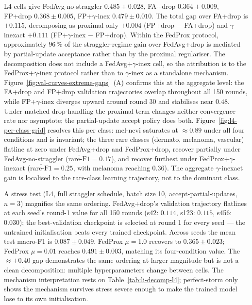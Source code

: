 \documentclass[11pt,a4paper]{report}
\begin{document}
L4 cells give FedAvg-no-straggler $0.485 \pm 0.028$, FA+drop
$0.364 \pm 0.009$, FP+drop $0.368 \pm 0.005$, FP+$\gamma$-inex
$0.479 \pm 0.010$. The total gap over FA+drop is $+0.115$, decomposing as
proximal-only $+0.004$ (FP+drop $-$ FA+drop) and $\gamma$-inexact $+0.111$
(FP+$\gamma$-inex $-$ FP+drop). Within the FedProx protocol, approximately
$96\,\%$ of the straggler-regime gain over FedAvg+drop is mediated by
partial-update acceptance rather than by the proximal regulariser. The
decomposition does not include a FedAvg+$\gamma$-inex cell, so the
attribution is to the FedProx+$\gamma$-inex protocol rather than to
$\gamma$-inex as a standalone mechanism.
Figure~\ref{fig:val-curves-extreme-gaps}~(A) confirms this at the aggregate
level: the FA+drop and FP+drop validation trajectories overlap throughout all
150 rounds, while FP+$\gamma$-inex diverges upward around round 30 and
stabilises near $0.48$. Under matched drop-handling the proximal term
changes neither convergence rate nor asymptote; the partial-update accept
policy does both. Figure~\ref{fig:l4-per-class-grid} resolves this per
class: mel-nevi saturates at $\approx 0.89$ under all four conditions and is
invariant; the three rare classes (dermato, melanoma, vascular) flatline at
zero under FedAvg+drop and FedProx+drop, recover partially under
FedAvg-no-straggler ($\overline{\text{rare-F1}} = 0.17$), and recover
furthest under FedProx+$\gamma$-inexact
($\overline{\text{rare-F1}} = 0.25$, with melanoma reaching $0.36$). The
aggregate $\gamma$-inexact gain is localised to the rare-class learning
trajectory, not to the dominant class.

A stress test (L4, full straggler schedule, batch size 10,
accept-partial-updates, $n=3$) magnifies the same ordering. FedAvg+drop's
validation trajectory flatlines at each seed's round-1 value for all 150
rounds (s42: $0.114$, s123: $0.115$, s456: $0.030$); the best-validation
checkpoint is selected at round 1 for every seed --- the untrained
initialisation beats every trained checkpoint. Across seeds the mean test
macro-F1 is $0.087 \pm 0.049$. FedProx $\mu = 1.0$ recovers to $0.365 \pm 0.023$;
FedProx $\mu = 0.01$ reaches $0.491 \pm 0.003$, matching its four-condition
value. The $\approx +0.40$ gap demonstrates the same ordering at larger
magnitude but is not a clean decomposition: multiple hyperparameters change
between cells. The mechanism interpretation rests on Table~\ref{tab:li-decomp-l4};
perfect-storm only shows the mechanism survives stress severe enough to
make the trained model lose to its own initialisation.
\end{document}
